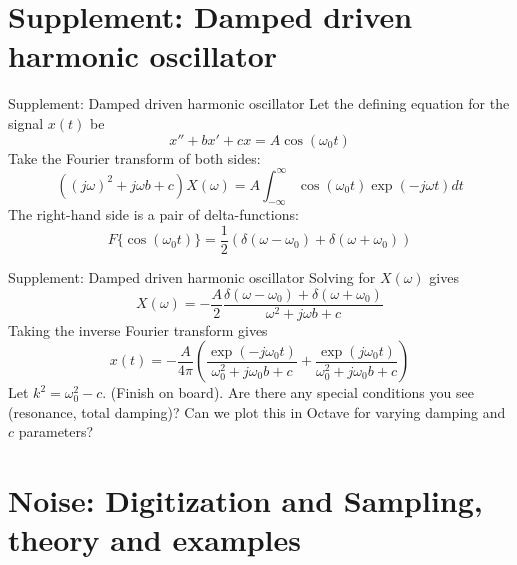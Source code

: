 \documentclass{beamer}
\begin{document}
\section{Supplement: Damped driven harmonic oscillator}

\begin{frame}{Supplement: Damped driven harmonic oscillator}
Let the defining equation for the signal $x(t)$ be
\begin{equation}
x'' + bx' + cx = A\cos(\omega_0 t)
\end{equation}
Take the Fourier transform of both sides:
\begin{equation}
\left((j\omega)^2 + j\omega b + c\right)X(\omega) = A \int_{-\infty}^{\infty} \cos(\omega_0 t) \exp(-j\omega t) dt
\end{equation}
The right-hand side is a pair of delta-functions:
\begin{equation}
F\lbrace \cos(\omega_0 t) \rbrace = \frac{1}{2}\left(\delta(\omega-\omega_0) + \delta(\omega+\omega_0)\right)
\end{equation}
\end{frame}

\begin{frame}{Supplement: Damped driven harmonic oscillator}
\small
Solving for $X(\omega)$ gives
\begin{equation}
X(\omega) = -\frac{A}{2}\frac{\delta(\omega-\omega_0) + \delta(\omega+\omega_0)}{\omega^2 + j\omega b + c}
\end{equation}
Taking the inverse Fourier transform gives
\begin{equation}
x(t) = -\frac{A}{4\pi}\left(\frac{\exp(-j\omega_0 t)}{\omega_0^2 + j\omega_0 b + c}+\frac{\exp(j\omega_0 t)}{\omega_0^2 + j\omega_0 b + c}\right)
\end{equation}
Let $k^2 = \omega_0^2-c$.  (Finish on board). Are there any special conditions you see (resonance, total damping)?  Can we plot this in Octave for varying damping and $c$ parameters?

\end{frame}

\section{Noise: Digitization and Sampling, theory and examples}
\end{document}
